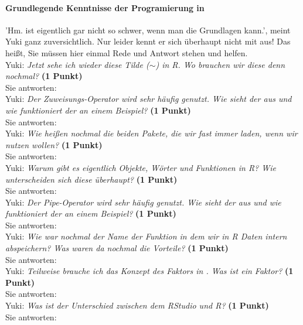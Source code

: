 \documentclass[a4paper, 9pt]{scrartcl}\usepackage[]{graphicx}\usepackage[]{xcolor}
\begin{document}
\ifcollection
\paragraph{Grundlegende Kenntnisse der Programierung in \Rlogo}
\fi

'Hm. \Rlogo ist eigentlich gar nicht so schwer, wenn man die Grundlagen kann.', meint  Yuki ganz zuversichtlich. Nur leider kennt er sich überhaupt nicht mit \Rlogo aus! Das heißt, Sie müssen hier einmal Rede und Antwort stehen und helfen.\\[1Ex]

Yuki: \textit{Jetzt sehe ich wieder diese Tilde ($\sim$) in R. Wo brauchen wir diese denn nochmal?} \textbf{(1 Punkt)}\\[1ex]
Sie antworten:\\[3Ex]

Yuki: \textit{Der Zuweisungs-Operator wird sehr häufig genutzt. Wie sieht der aus und wie funktioniert der an einem Beispiel?} \textbf{(1 Punkt)}\\[1ex]
Sie antworten:\\[3Ex]

Yuki: \textit{Wie heißen nochmal die beiden \Rlogo Pakete, die wir fast immer laden, wenn wir \Rlogo nutzen wollen?} \textbf{(1 Punkt)}\\[1ex]
Sie antworten:\\[3Ex]

Yuki: \textit{Warum gibt es eigentlich Objekte, Wörter und Funktionen in R? Wie unterscheiden sich diese überhaupt?} \textbf{(1 Punkt)}\\[1ex]
Sie antworten:\\[3Ex]

Yuki: \textit{Der Pipe-Operator wird sehr häufig genutzt. Wie sieht der aus und wie funktioniert der an einem Beispiel?} \textbf{(1 Punkt)}\\[1ex]
Sie antworten:\\[3Ex]

Yuki: \textit{Wie war nochmal der Name der Funktion in dem wir in R Daten intern abspeichern? Was waren da nochmal die Vorteile?} \textbf{(1 Punkt)}\\[1ex]
Sie antworten:\\[3Ex]

Yuki: \textit{Teilweise brauche ich das Konzept des Faktors in \Rlogo. Was ist ein Faktor?} \textbf{(1 Punkt)}\\[1ex]
Sie antworten:\\[3Ex]

Yuki: \textit{Was ist der Unterschied zwischen dem RStudio und R?} \textbf{(1 Punkt)}\\[1ex]
Sie antworten:\\[3Ex]
\end{document}
